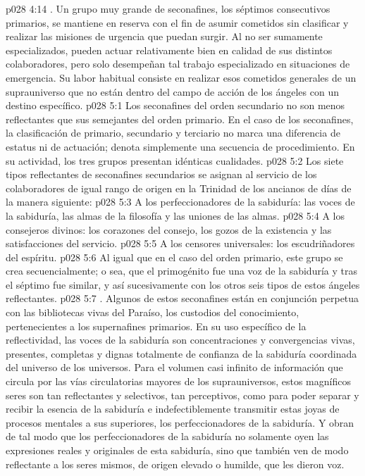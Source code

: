 \vs p028 4:14 . Un grupo muy grande de seconafines, los séptimos consecutivos primarios, se mantiene en reserva con el fin de asumir cometidos sin clasificar y realizar las misiones de urgencia que puedan surgir. Al no ser sumamente especializados, pueden actuar relativamente bien en calidad de sus distintos colaboradores, pero solo desempeñan tal trabajo especializado en situaciones de emergencia. Su labor habitual consiste en realizar esos cometidos generales de un suprauniverso que no están dentro del campo de acción de los ángeles con un destino específico.
\vs p028 5:1 Los seconafines del orden secundario no son menos reflectantes que sus semejantes del orden primario. En el caso de los seconafines, la clasificación de primario, secundario y terciario no marca una diferencia de estatus ni de actuación; denota simplemente una secuencia de procedimiento. En su actividad, los tres grupos presentan idénticas cualidades.
\vs p028 5:2 \pc Los siete tipos reflectantes de seconafines secundarios se asignan al servicio de los colaboradores de igual rango de origen en la Trinidad de los ancianos de días de la manera siguiente:
\vs p028 5:3 A los perfeccionadores de la sabiduría: las voces de la sabiduría, las almas de la filosofía y las uniones de las almas.
\vs p028 5:4 A los consejeros divinos: los corazones del consejo, los gozos de la existencia y las satisfacciones del servicio.
\vs p028 5:5 A los censores universales: los escudriñadores del espíritu.
\vs p028 5:6 \pc Al igual que en el caso del orden primario, este grupo se crea secuencialmente; o sea, que el primogénito fue una voz de la sabiduría y tras el séptimo fue similar, y así sucesivamente con los otros seis tipos de estos ángeles reflectantes.
\vs p028 5:7 . Algunos de estos seconafines están en conjunción perpetua con las bibliotecas vivas del Paraíso, los custodios del conocimiento, pertenecientes a los supernafines primarios. En su uso específico de la reflectividad, las voces de la sabiduría son concentraciones y convergencias vivas, presentes, completas y dignas totalmente de confianza de la sabiduría coordinada del universo de los universos. Para el volumen casi infinito de información que circula por las vías circulatorias mayores de los suprauniversos, estos magníficos seres son tan reflectantes y selectivos, tan perceptivos, como para poder separar y recibir la esencia de la sabiduría e indefectiblemente transmitir estas joyas de procesos mentales a sus superiores, los perfeccionadores de la sabiduría. Y obran de tal modo que los perfeccionadores de la sabiduría no solamente oyen las expresiones reales y originales de esta sabiduría, sino que también ven de modo reflectante a los seres mismos, de origen elevado o humilde, que les dieron voz.
